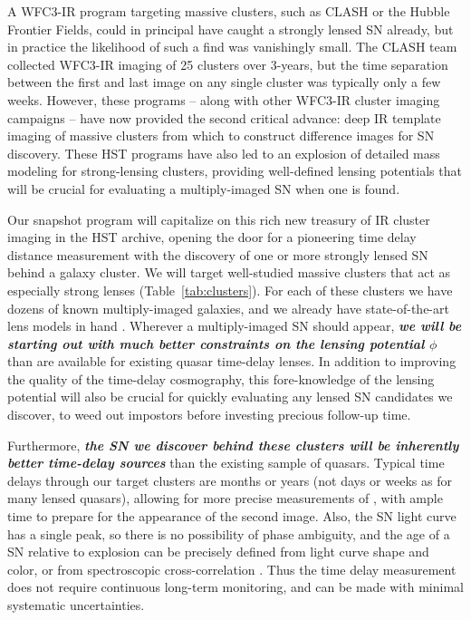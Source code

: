 A WFC3-IR program targeting massive clusters, such as CLASH or the
Hubble Frontier Fields, could in principal have caught a strongly
lensed SN already, but in practice the likelihood of such a find was
vanishingly small.  The CLASH team collected WFC3-IR imaging of 25
clusters over 3-years, but the time separation between the first and
last image on any single cluster was typically only a few weeks.
However, these programs -- along with other WFC3-IR cluster imaging
campaigns -- have now provided the second critical advance: deep IR
template imaging of massive clusters from which to construct
difference images for SN discovery.  These HST programs have also led
to an explosion of detailed mass modeling for strong-lensing clusters,
providing well-defined lensing potentials that will be crucial for
evaluating a multiply-imaged SN when one is found.  

Our snapshot program will capitalize on this rich new treasury of IR
cluster imaging in the HST archive, opening the door for a pioneering
time delay distance measurement with the discovery of one or more
strongly lensed SN behind a galaxy cluster.  We will target
well-studied massive clusters that act as especially strong lenses
(Table~\ref{tab:clusters}). For each of these clusters we have dozens
of known multiply-imaged galaxies, and we already have
state-of-the-art lens models in
hand \citep[e.g.][]{Zitrin:2011a,Zitrin:2011b,Zitrin:2012a,Zitrin:2012b,Zitrin:2013}.
Wherever a multiply-imaged SN should appear, {\bf \em we will be
starting out with much better constraints on the lensing potential
$\phi$} than are available for existing quasar time-delay lenses. In
addition to improving the quality of the time-delay cosmography, this
fore-knowledge of the lensing potential will also be crucial for
quickly evaluating any lensed SN candidates we discover, to weed out
impostors before investing precious follow-up time.

Furthermore, {\bf \em the SN we discover behind these clusters will be
inherently better time-delay sources} than the existing sample of
quasars.  Typical time delays through our target clusters are months
or years (not days or weeks as for many lensed quasars), allowing for
more precise measurements of \dt, with ample time to prepare for the
appearance of the second image.  Also, the SN light curve has a single
peak, so there is no possibility of phase ambiguity, and the age of a
SN relative to explosion can be precisely defined from light curve
shape and color, or from spectroscopic
cross-correlation \citep{Filippenko:1997,Blondin:2007}.  Thus the time
delay measurement does not require continuous long-term monitoring,
and can be made with minimal systematic uncertainties.

